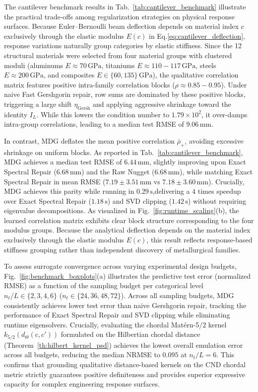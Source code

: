 \documentclass[default,sn-mathphys,Numbered]{sn-jnl}
\theoremstyle{thmstyleone}
\theoremstyle{thmstylethree}
\theoremstyle{thmstyletwo}
\newcommand{\eqnref}[1]{\eqref{#1}}
\begin{document}
The cantilever benchmark results in Tab.~\ref{tab:cantilever_benchmark} illustrate the practical trade-offs among regularization strategies on physical response surfaces. Because Euler--Bernoulli beam deflection depends on material index $c$ exclusively through the elastic modulus $E(c)$ in Eq.\eqnref{eq:cantilever_deflection}, response variations naturally group categories by elastic stiffness. Since the 12 structural materials were selected from four material groups with clustered moduli (aluminums $E \approx 70\,\mathrm{GPa}$, titaniums $E \approx 110-117\,\mathrm{GPa}$, steels $E \approx 200\,\mathrm{GPa}$, and composites $E \in \{60, 135\}\,\mathrm{GPa}$), the qualitative correlation matrix features positive intra-family correlation blocks ($\rho \approx 0.85 - 0.95$). Under naive Fast Gershgorin repair, row sums are dominated by these positive blocks, triggering a large shift $\eta_{\mathrm{Gersh}}$ and applying aggressive shrinkage toward the identity $I_L$. While this lowers the condition number to $1.79 \times 10^2$, it over-damps intra-group correlations, leading to a median test RMSE of $9.06\,\mathrm{mm}$.

In contrast, MDG deflates the mean positive correlation $\bar{\rho}_+$, avoiding excessive shrinkage on uniform blocks. As reported in Tab.~\ref{tab:cantilever_benchmark}, MDG achieves a median test RMSE of $\mathbf{6.44\,\mathrm{mm}}$, slightly improving upon Exact Spectral Repair ($6.68\,\mathrm{mm}$) and the Raw Nugget ($6.68\,\mathrm{mm}$), while matching Exact Spectral Repair in mean RMSE ($7.19 \pm 3.51\,\mathrm{mm}$ vs $7.18 \pm 3.60\,\mathrm{mm}$). Crucially, MDG achieves this parity while running in \textbf{$0.29\,\mathrm{s}$},delivering a $4$ times speedup over Exact Spectral Repair ($1.18\,\mathrm{s}$) and SVD clipping ($1.42\,\mathrm{s}$) without requiring eigenvalue decompositions. As visualized in Fig.~\ref{fig:runtime_scaling}(b), the learned correlation matrix exhibits clear block structure corresponding to the four modulus groups. Because the analytical deflection depends on the material index exclusively through the elastic modulus $E(c)$, this result reflects response-based stiffness grouping rather than independent discovery of metallurgical families.

To assess surrogate convergence across varying experimental design budgets, Fig.~\ref{fig:benchmark_boxplots}(a) illustrates the predictive test error (normalized RMSE) as a function of the sampling budget per categorical level $n_t/L \in \{2, 3, 4, 6\}$ ($n_t \in \{24, 36, 48, 72\}$). Across all sampling budgets, MDG consistently achieves lower test error than naive Gershgorin repair, tracking the performance of Exact Spectral Repair and SVD clipping while eliminating runtime eigensolvers. Crucially, evaluating the chordal Mat\'ern-5/2 kernel $k_{5/2}(d_\Theta(c, c'))$ formulated on the Hilbertian chordal distance (Theorem~\ref{th:hilbert_kernel_psd}) achieves the lowest overall emulation error across all budgets, reducing the median NRMSE to $0.095$ at $n_t/L = 6$. This confirms that grounding qualitative distance-based kernels on the CND chordal metric strictly guarantees positive definiteness and provides superior expressive capacity for complex engineering response surfaces.
\end{document}
